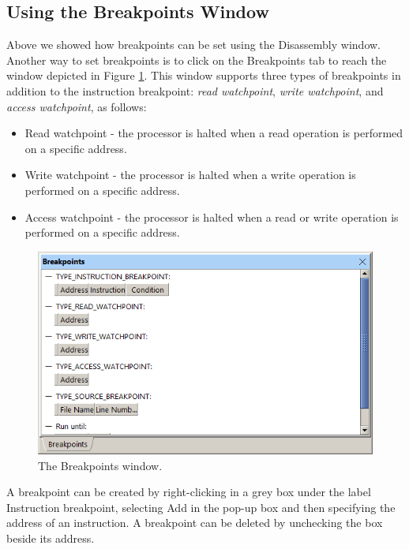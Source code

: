 \documentclass[11pt, twoside, pdftex]{article}
\begin{document}
\subsection{Using the Breakpoints Window}

Above we showed how breakpoints can be set using the Disassembly
window. Another way to set breakpoints is to click on the 
{\sf Breakpoints} tab to reach the window depicted in Figure \ref{fig:AMP_breakpointswindow}.
This window supports three 
types of breakpoints in addition to the instruction breakpoint:
{\it read watchpoint}, {\it write watchpoint}, and 
{\it access watchpoint}, as follows:

\begin{itemize}
\item Read watchpoint - the processor is halted when a read
operation is performed on a specific address.
\item Write watchpoint - the processor is halted when a write
operation is performed on a specific address.
\item Access watchpoint - the processor is halted when a read or
write operation is performed on a specific address.
\end{itemize}


\begin{figure}[H]
   \begin{center}
      \includegraphics[scale=0.6]{screenshots/figure24.png}
   \end{center}
   \caption{The Breakpoints window.} 
   \label{fig:AMP_breakpointswindow}
\end{figure}

A breakpoint can be created by right-clicking in
a grey box under the label {\sf Instruction breakpoint},
selecting {\sf Add} in the pop-up box and then specifying the
address of an instruction. A breakpoint can be
deleted by unchecking the box beside its address.
\end{document}

